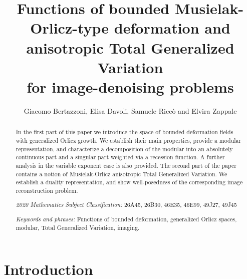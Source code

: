 \documentclass[a4paper,11pt,oneside,notitlepage]{article}
\title{Functions of bounded Musielak-Orlicz-type deformation and anisotropic Total Generalized Variation \\ for image-denoising problems}
\author{Giacomo Bertazzoni, Elisa Davoli, Samuele Riccò and Elvira Zappale}
\numberwithin{equation}{section}
\begin{document}
\maketitle

\begin{abstract}
    \noindent
    In the first part of this paper we introduce the space of bounded deformation fields with generalized Orlicz growth. We establish their main properties, provide a modular representation, and characterize a decomposition of the modular into an absolutely continuous part and a singular part weighted via a recession function. A further analysis in the variable exponent case is also provided. The second part of the paper contains a notion of Musielak-Orlicz anisotropic Total Generalized Variation. We establish a duality representation, and show well-posedness of the corresponding image reconstruction problem.
    
    \medskip
    
    \noindent
    {\it 2020 Mathematics Subject Classification:} 26A45, 26B30, 46E35, 46E99, 49J27, 49J45
    
    \smallskip
    
    \noindent
    {\it Keywords and phrases:}
    Functions of bounded deformation, generalized Orlicz spaces, modular, Total Generalized Variation, imaging.
    
\end{abstract}



\section{Introduction}
\label{intro}
\end{document}

